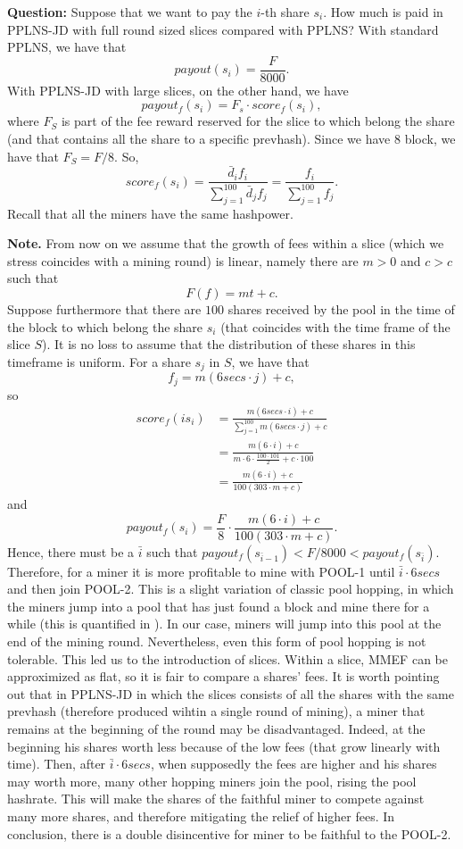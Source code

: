 \documentclass[11pt]{article}
\begin{document}
\textbf{Question:} Suppose that we want to pay the $i$-th share $s_i$. How much is paid in PPLNS-JD with full round sized slices compared with PPLNS?
With standard PPLNS, we have that
\[payout(s_i) = \frac{F}{8000}.\]
With PPLNS-JD with large slices, on the other hand, we have
\[payout_f(s_i) = F_s\cdot score_f(s_i),\]
where $F_S$ is part of the fee reward reserved for the slice to which belong the share (and that contains all the share to a specific prevhash). Since we have $8$ block, we have that $F_S = F/8$. So,
\[score_f(s_i) = \frac{\bar d_i f_i}{\sum_{j=1}^{100} \bar d_j f_j}= \frac{ f_i}{\sum_{j=1}^{100} f_j}. \]
Recall that all the miners have the same hashpower.

\textbf{Note.} From now on we assume that the growth of fees within a slice (which we stress coincides with a mining round) is linear, namely there are $m>0$ and $c>c$ such that 
\[F(f) = mt+c.\]
Suppose furthermore that there are $100$ shares received by the pool in the time of the block to which belong the share $s_i$ (that coincides with the time frame of the slice $S$). It is no loss to assume that the distribution of these shares in this timeframe is uniform. For a share $s_j$ in $S$, we have that 
\[ f_j = m(6secs \cdot j) +c,\]
so
\begin{align*}
	score_f(is_i) &= \frac{m(6secs\cdot i) +c}{\sum_{j=1}^{100} m(6secs\cdot j) +c}\\
	&= \frac{m(6\cdot i) +c}{m\cdot 6\cdot\frac{100\cdot101}{2} +c\cdot 100}\\
	&= \frac{m(6\cdot i) +c}{100(303\cdot m +c)}
\end{align*}
and 
\[payout_f(s_i) = \frac{F}{8} \cdot \frac{m(6\cdot i) +c}{100(303\cdot m +c)}.\]
Hence, there must be a $\bar i$ such that $payout_f(s_{\bar i -1})< F/8000<payout_f(s_{\bar i })$.
Therefore, for a miner it is more profitable to mine with POOL-1 until $\bar i \cdot 6 secs$ and then join POOL-2. This is a slight variation of classic pool hopping, in which the miners jump into a pool that has just found a block and mine there for a while (this is quantified in \cite{rosenfeld}). In our case, miners will jump into this pool at the end of the mining round. Nevertheless, even this form of pool hopping is not tolerable. This led us to the introduction of slices. Within a slice, MMEF can be approximized as flat, so it is fair to compare a shares' fees.
It is worth pointing out that in PPLNS-JD in which the slices consists of all the shares with the same prevhash (therefore produced wihtin a single round of mining), a miner that remains at the beginning of the round may be disadvantaged. Indeed, at the beginning his shares worth less because of the low fees (that grow linearly with time). Then, after $\bar i \cdot 6 secs$, when supposedly the fees are higher and his shares may worth more, many other hopping miners join the pool, rising the pool hashrate. This will make the shares of the faithful miner to compete against many more shares, and therefore mitigating the relief of higher fees. In conclusion, there is a double disincentive for miner to be faithful to the POOL-2.
\end{document}

